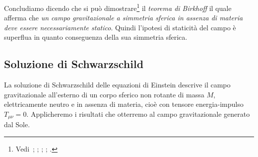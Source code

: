 Concludiamo dicendo che si può
dimostrare\footnote{Vedi~\textcite[390-393]{landau:campi};
  \textcite[843-844]{misner:gravitation};
  \textcite[337-340]{ohanian:gravitazione};
  \textcite[166-171]{straumann:general};
  \textcite[335-337]{weinberg:gravitation}.}  il \emph{teorema di Birkhoff}
 il quale afferma che \emph{un campo gravitazionale a
  simmetria sferica in assenza di materia deve essere necessariamente
  statico}. Quindi l'ipotesi di staticità del campo è superflua in quanto
conseguenza della sua simmetria sferica.

\subsection{Soluzione di Schwarzschild}
\label{sec:metrica-schwarzschild}

La soluzione di Schwarzschild delle equazioni di Einstein descrive il campo
gravitazionale all'esterno di un corpo sferico non rotante di massa $M$,
elettricamente neutro e in assenza di materia, cioè con tensore energia-impulso
$T_{\mu\nu} = 0$.  Applicheremo i risultati che otterremo al campo
gravitazionale generato dal Sole.

